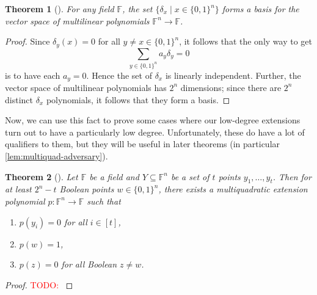 \documentclass[english,12pt]{reedthesis}
\theoremstyle{plain}
\newtheorem{thm}{Theorem}[section]
\theoremstyle{definition}
\theoremstyle{remark}
\newcommand{\TODO}[1]{\textcolor{red}{TODO: #1}}
\begin{document}
\begin{thm}[{\cite[]{AW09}}]\label{thm:delta-poly-basis}
  For any field $\mathbb{F}$, the set $\{\delta_{x} \mid x \in \{0, 1\}^{n}\}$ forms a
  basis for the vector space of multilinear polynomials
  $\mathbb{F}^{n} \rightarrow \mathbb{F}$.
\end{thm}

\begin{proof}
  Since $\delta_{y}(x) = 0$ for all $y \ne x \in \{0, 1\}^{n}$, it follows that the only
  way to get
  \begin{equation}
    \sum_{y \in \{0, 1\}^{n}}a_{y}\delta_{y} = 0
  \end{equation}
  is to have each $a_{y} = 0$. Hence the set of $\delta_{x}$ is linearly independent.
  Further, the vector space of multilinear polynomials has $2^{n}$ dimensions;
  since there are $2^{n}$ distinct $\delta_{x}$ polynomials, it follows that they
  form a basis.
\end{proof}

Now, we can use this fact to prove some cases where our low-degree extensions
turn out to have a particularly low degree. Unfortunately, these do have a lot
of qualifiers to them, but they will be useful in later theorems (in particular
\cref{lem:multiquad-adversary}).

\begin{thm}[{\cite[Theorem 4.3]{AW09}}]\label{thm:multiquad-extension}
  Let $\mathbb{F}$ be a field and $Y \subseteq \mathbb{F}^{n}$ be a set of $t$ points
  $y_{1}, \ldots, y_{t}$. Then for at least $2^{n} - t$ Boolean points
  $w \in \{0, 1\}^{n}$, there exists a multiquadratic extension polynomial
  $p\colon \mathbb{F}^{n} \rightarrow \mathbb{F}$ such that
  \begin{enumerate}
    \item $p(y_{i}) = 0$ for all $i \in [t]$,
    \item $p(w) = 1$,
    \item $p(z) = 0$ for all Boolean $z \ne w$.
  \end{enumerate}
\end{thm}

\begin{proof}
  \TODO{}
\end{proof}
\end{document}
